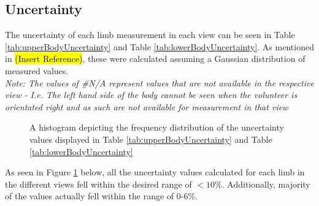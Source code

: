 \subsection{Uncertainty}
The uncertainty of each limb measurement in each view can be seen in Table \ref{tab:upperBodyUncertainty} and Table \ref{tab:lowerBodyUncertainty}. As mentioned in \hl{(Insert Reference)}, these were calculated assuming a Gaussian distribution of measured values.\\ 
\textit{Note: The values of \#N/A represent values that are not available in the respective view - I.e. The left hand side of the body cannot be seen when the volunteer is orientated right and as such are not available for measurement in that view}

\begin{figure}[ht]
	\centering
	{%
		\setlength{\fboxsep}{0pt}%
		\setlength{\fboxrule}{0.5pt}%
		}
	\caption{A histogram depicting the frequency distribution of the uncertainty values displayed in Table \ref{tab:upperBodyUncertainty} and Table \ref{tab:lowerBodyUncertainty}}
	\label{fig:uncertaintyFreqDist}
\end{figure}

As seen in Figure \ref{fig:uncertaintyFreqDist} below, all the uncertainty values calculated for each limb in the different views fell within the desired range of $<10\%$. Additionally, majority of the values actually fell within the range of 0-6\%. 

